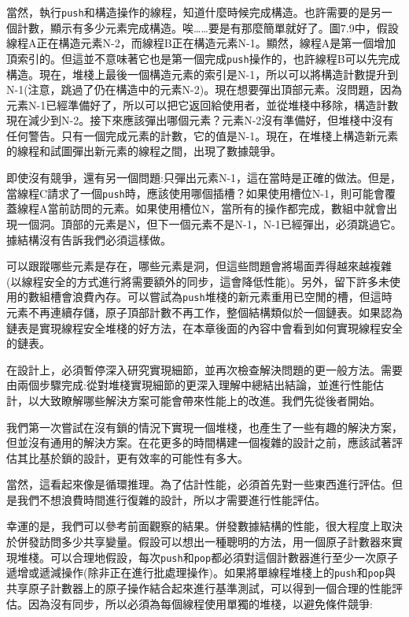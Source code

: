 當然，執行\texttt{push}和構造操作的線程，知道什麼時候完成構造。也許需要的是另一個計數，顯示有多少元素完成構造。唉……要是有那麼簡單就好了。圖7.9中，假設線程A正在構造元素N-2，而線程B正在構造元素N-1。顯然，線程A是第一個增加頂索引的。但這並不意味著它也是第一個完成\texttt{push}操作的，也許線程B可以先完成構造。現在，堆棧上最後一個構造元素的索引是N-1，所以可以將構造計數提升到N-1(注意，跳過了仍在構造中的元素N-2)。現在想要彈出頂部元素。沒問題，因為元素N-1已經準備好了，所以可以把它返回給使用者，並從堆棧中移除，構造計數現在減少到N-2。接下來應該彈出哪個元素？元素N-2沒有準備好，但堆棧中沒有任何警告。只有一個完成元素的計數，它的值是N-1。現在，在堆棧上構造新元素的線程和試圖彈出新元素的線程之間，出現了數據競爭。

即使沒有競爭，還有另一個問題:只彈出元素N-1，這在當時是正確的做法。但是，當線程C請求了一個\texttt{push}時，應該使用哪個插槽？如果使用槽位N-1，則可能會覆蓋線程A當前訪問的元素。如果使用槽位N，當所有的操作都完成，數組中就會出現一個洞。頂部的元素是N，但下一個元素不是N-1，N-1已經彈出，必須跳過它。據結構沒有告訴我們必須這樣做。

可以跟蹤哪些元素是存在，哪些元素是洞，但這些問題會將場面弄得越來越複雜(以線程安全的方式進行將需要額外的同步，這會降低性能)。另外，留下許多未使用的數組槽會浪費內存。可以嘗試為\texttt{push}堆棧的新元素重用已空閒的槽，但這時元素不再連續存儲，原子頂部計數不再工作，整個結構類似於一個鏈表。如果認為鏈表是實現線程安全堆棧的好方法，在本章後面的內容中會看到如何實現線程安全的鏈表。

在設計上，必須暫停深入研究實現細節，並再次檢查解決問題的更一般方法。需要由兩個步驟完成:從對堆棧實現細節的更深入理解中總結出結論，並進行性能估計，以大致瞭解哪些解決方案可能會帶來性能上的改進。我們先從後者開始。


我們第一次嘗試在沒有鎖的情況下實現一個堆棧，也產生了一些有趣的解決方案，但並沒有通用的解決方案。在花更多的時間構建一個複雜的設計之前，應該試著評估其比基於鎖的設計，更有效率的可能性有多大。

當然，這看起來像是循環推理。為了估計性能，必須首先對一些東西進行評估。但是我們不想浪費時間進行復雜的設計，所以才需要進行性能評估。

幸運的是，我們可以參考前面觀察的結果。併發數據結構的性能，很大程度上取決於併發訪問多少共享變量。假設可以想出一種聰明的方法，用一個原子計數器來實現堆棧。可以合理地假設，每次\texttt{push}和\texttt{pop}都必須對這個計數器進行至少一次原子遞增或遞減操作(除非正在進行批處理操作)。如果將單線程堆棧上的\texttt{push}和\texttt{pop}與共享原子計數器上的原子操作結合起來進行基準測試，可以得到一個合理的性能評估。因為沒有同步，所以必須為每個線程使用單獨的堆棧，以避免條件競爭:

